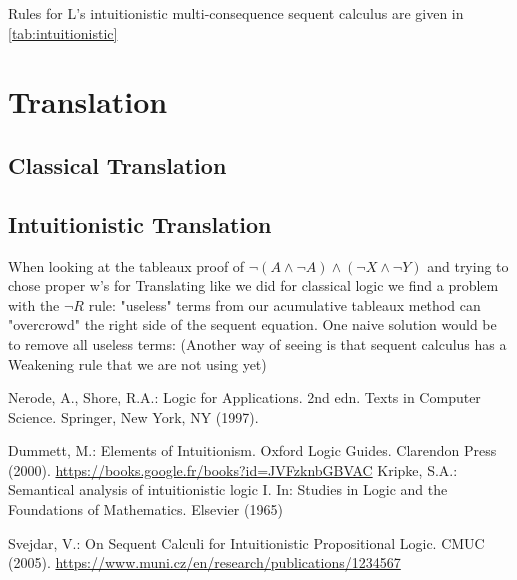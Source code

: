 \documentclass[runningheads]{llncs}
\begin{document}
\developmentSequentIntuitionisticDefinition

Rules for L's intuitionistic multi-consequence sequent calculus are given in \ref{tab:intuitionistic}


\RulesIntuitionisticSequentCalculus


\section{Translation}

\nodeTranslationFunction

\uselessTheorem

\subsection{Classical Translation}



\localTranslationValidityTheorem
    


\TranslationClassical

\TranslationClassicalProof



\subsection{Intuitionistic Translation}
When looking at the tableaux proof of $\neg (A \land \neg A) \land (\neg X \land \neg Y)$ and trying to chose 
proper w's for Translating like we did for classical logic we find a problem with the $\neg R$ rule:
"useless" terms from our acumulative tableaux method can "overcrowd" the right side of the sequent equation. One naive solution would be 
to remove all useless terms: (Another way of seeing is that sequent calculus has a Weakening rule that we are not using yet) 
\ThinningFunctionDefinition

\nFProof

%
%
%
% 
% 
%
\begin{thebibliography}{8}

    Nerode, A., Shore, R.A.: Logic for Applications. 2nd edn. Texts in Computer Science. Springer, New York, NY (1997). 
    
    Dummett, M.: Elements of Intuitionism. Oxford Logic Guides. Clarendon Press (2000). \url{https://books.google.fr/books?id=JVFzknbGBVAC}
    Kripke, S.A.: Semantical analysis of intuitionistic logic I. In: Studies in Logic and the Foundations of Mathematics. Elsevier (1965)


    Svejdar, V.: On Sequent Calculi for Intuitionistic Propositional Logic. CMUC (2005). \url{https://www.muni.cz/en/research/publications/1234567}


\end{thebibliography}
\end{document}

